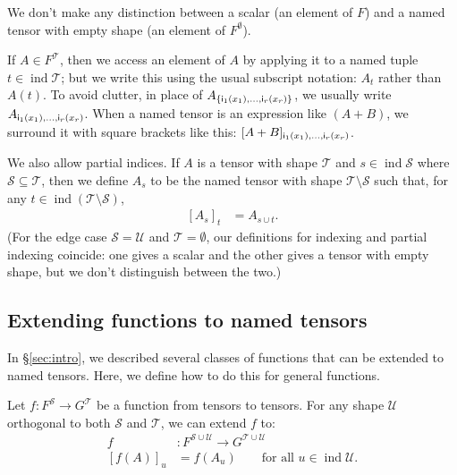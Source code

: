 \documentclass{article}
\newcommand{\tuple}[1]{\{#1\}}
\DeclareMathOperator{\tupleshape}{ind}
\begin{document}
We don't make any distinction between a scalar (an element of $F$) and a named tensor with empty shape (an element of $F^\emptyset$).

If $A \in F^{\mathcal{T}}$, then we access an element of $A$ by applying it to a named tuple $t \in \tupleshape\mathcal{T}$; but we write this using the usual subscript notation: $A_t$ rather than $A(t)$. To avoid clutter, in place of $A_{\tuple{\nidx{i\sub{1}}{x_1}, \ldots, \nidx{i\sub{r}}{x_r}}}$, we usually write $A_{\mathsf{i_\text{$1$}}(x_1), \ldots, \mathsf{i_\text{$r$}}(x_r)}$. When a named tensor is an expression like $(A+B)$, we surround it with square brackets like this: $[A+B]_{\mathsf{i_\text{$1$}}(x_1), \ldots, \mathsf{i_\text{$r$}}(x_r)}$.

We also allow partial indices. If $A$ is a tensor with shape $\mathcal{T}$ and $s \in \tupleshape \mathcal{S}$ where $\mathcal{S} \subseteq \mathcal{T}$, then we define $A_s$ to be the named tensor with shape $\mathcal{T} \setminus \mathcal{S}$ such that, for any $t \in \tupleshape (\mathcal{T} \setminus \mathcal{S})$,
\begin{align*}
\left[A_s\right]_t &= A_{s \cup t}.
\end{align*}
(For the edge case $\mathcal{S} = \mathcal{U}$ and $\mathcal{T} = \emptyset$, our definitions for indexing and partial indexing coincide: one gives a scalar and the other gives a tensor with empty shape, but we don't distinguish between the two.)

\subsection{Extending functions to named tensors}
\label{sec:tensorfunctions}

In \S\ref{sec:intro}, we described several classes of functions that can be extended to named tensors. Here, we define how to do this for general functions.

Let $f \colon F^{\mathcal{S}} \rightarrow G^{\mathcal{T}}$ be a function from tensors to tensors. For any shape $\mathcal{U}$ orthogonal to both $\mathcal{S}$ and $\mathcal{T}$, we can extend $f$ to:
\begin{align*}
f &: F^{\mathcal{S} \cup \mathcal{U}} \rightarrow G^{\mathcal{T} \cup \mathcal{U}} \\
[f(A)]_u &= f(A_u) \qquad \text{for all $u \in \tupleshape\mathcal{U}$.}
\end{align*}
\end{document}
